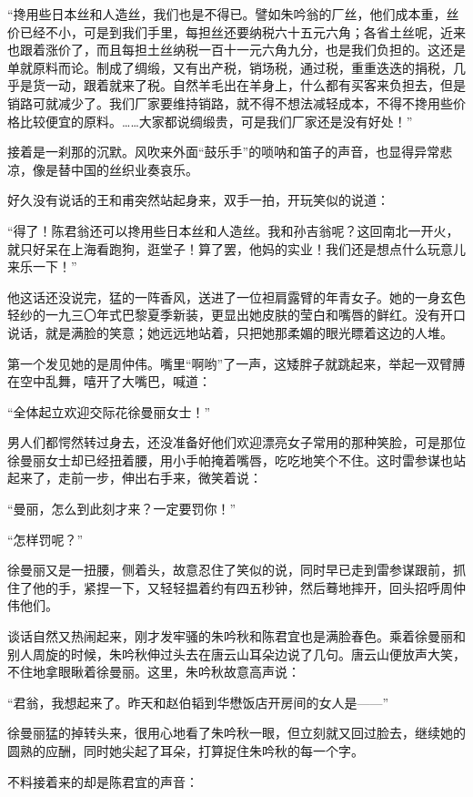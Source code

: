 \par “搀用些日本丝和人造丝，我们也是不得已。譬如朱吟翁的厂丝，他们成本重，丝价已经不小，可是到我们手里，每担丝还要纳税六十五元六角；各省土丝呢，近来也跟着涨价了，而且每担土丝纳税一百十一元六角九分，也是我们负担的。这还是单就原料而论。制成了绸缎，又有出产税，销场税，通过税，重重迭迭的捐税，几乎是货一动，跟着就来了税。自然羊毛出在羊身上，什么都有买客来负担去，但是销路可就减少了。我们厂家要维持销路，就不得不想法减轻成本，不得不搀用些价格比较便宜的原料。……大家都说绸缎贵，可是我们厂家还是没有好处！”
\par 接着是一刹那的沉默。风吹来外面“鼓乐手”的唢呐和笛子的声音，也显得异常悲凉，像是替中国的丝织业奏哀乐。
\par 好久没有说话的王和甫突然站起身来，双手一拍，开玩笑似的说道：
\par “得了！陈君翁还可以搀用些日本丝和人造丝。我和孙吉翁呢？这回南北一开火，就只好呆在上海看跑狗，逛堂子！算了罢，他妈的实业！我们还是想点什么玩意儿来乐一下！”
\par 他这话还没说完，猛的一阵香风，送进了一位袒肩露臂的年青女子。她的一身玄色轻纱的一九三〇年式巴黎夏季新装，更显出她皮肤的莹白和嘴唇的鲜红。没有开口说话，就是满脸的笑意；她远远地站着，只把她那柔媚的眼光瞟着这边的人堆。
\par 第一个发见她的是周仲伟。嘴里“啊哟”了一声，这矮胖子就跳起来，举起一双臂膊在空中乱舞，嘻开了大嘴巴，喊道：
\par “全体起立欢迎交际花徐曼丽女士！”
\par 男人们都愕然转过身去，还没准备好他们欢迎漂亮女子常用的那种笑脸，可是那位徐曼丽女士却已经扭着腰，用小手帕掩着嘴唇，吃吃地笑个不住。这时雷参谋也站起来了，走前一步，伸出右手来，微笑着说：
\par “曼丽，怎么到此刻才来？一定要罚你！”
\par “怎样罚呢？”
\par 徐曼丽又是一扭腰，侧着头，故意忍住了笑似的说，同时早已走到雷参谋跟前，抓住了他的手，紧捏一下，又轻轻揾着约有四五秒钟，然后蓦地摔开，回头招呼周仲伟他们。
\par 谈话自然又热闹起来，刚才发牢骚的朱吟秋和陈君宜也是满脸春色。乘着徐曼丽和别人周旋的时候，朱吟秋伸过头去在唐云山耳朵边说了几句。唐云山便放声大笑，不住地拿眼瞅着徐曼丽。这里，朱吟秋故意高声说：
\par “君翁，我想起来了。昨天和赵伯韬到华懋饭店开房间的女人是——”
\par 徐曼丽猛的掉转头来，很用心地看了朱吟秋一眼，但立刻就又回过脸去，继续她的圆熟的应酬，同时她尖起了耳朵，打算捉住朱吟秋的每一个字。
\par 不料接着来的却是陈君宜的声音：
